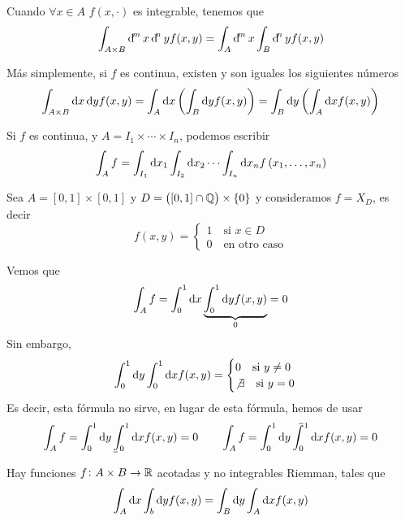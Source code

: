 \begin{obs}
    Cuando $\forall x \in A$ $f(x, \cdot)$ es integrable, tenemos que
    \[
        \int_{A \times B} \dif^m x \dif^n y f(x, y) = \int_A \dif^m x \int_B \dif^n y
        f(x, y)
    \]
\end{obs}

\begin{obs}
	Más simplemente, si $f$ es continua, existen y son iguales los siguientes números
	\[
		\int_{A \times B} \dif x \dif y f(x, y) = \int_A \dif x \left(\int_B
		\dif y f(x, y) \right) = \int_B \dif y \left( \int_A \dif x f(x, y) \right)
	\]
\end{obs}

\begin{col}
    Si $f$ es continua, y $A = I_1 \times \cdots \times I_n$, podemos escribir
    \[
        \int_A f = \int_{I_1} \dif x_1 \int_{I_2} \dif x_2 \cdots \int_{I_n} \dif x_n
        f\left( x_1, \dots , x_n \right)
    \]
\end{col}

\begin{example*}
    Sea $A = [0,1] \times [0,1]$ y $D = \left( [0,1] \cap \mathbb{Q} \right) \times \{0\}$ y
    consideramos $f = X_D$, es decir
    \[
        f(x, y) =
        \begin{cases}
            1 \quad \text{si } x \in D \\ 0 \quad \text{en otro caso}
        \end{cases}
    \]

    Vemos que 
    \[
        \int_A f = \int^1_0 \dif x \underbrace{\int^1_0 \dif y f(x, y)}_{0} = 0
    \]
    Sin embargo,
    \[
        \int^1_0 \dif y \int^1_0 \dif x f(x, y) =
        \begin{cases}
            0 \quad \text{si } y \neq 0 \\
            \not\exists \quad \text{si } y = 0
        \end{cases}
    \]
    Es decir, esta fórmula no sirve, en lugar de esta fórmula, hemos de usar
    \[
        \int_A f = \int^1_0 \dif y \lowint^1_0 \dif x f(x, y) = 0 \qquad
        \int_A f = \int^1_0 \dif y \upint^1_0 \dif x f(x, y) = 0
    \]
\end{example*}

\begin{obs}
    Hay funciones $f \colon A \times B \to \mathbb{R}$ acotadas y no integrables Riemman,
    tales que
    \[
        \int_A \dif x \int_b \dif y f(x, y) = \int_B \dif y \int_A \dif x f(x, y)
    \]
\end{obs}

